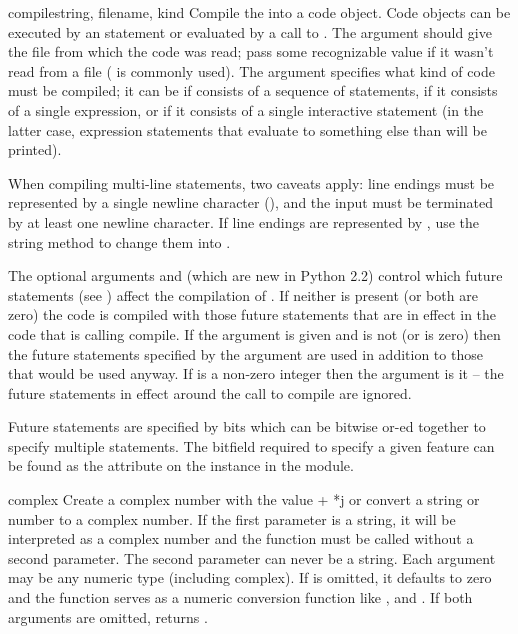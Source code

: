\begin{funcdesc}{compile}{string, filename, kind}
  Compile the  into a code object.  Code objects can be
  executed by an  statement or evaluated by a call to
  .  The  argument should
  give the file from which the code was read; pass some recognizable value
  if it wasn't read from a file ( is commonly used).
  The  argument specifies what kind of code must be
  compiled; it can be  if  consists of a
  sequence of statements,  if it consists of a single
  expression, or  if it consists of a single
  interactive statement (in the latter case, expression statements
  that evaluate to something else than  will be printed).

  When compiling multi-line statements, two caveats apply: line
  endings must be represented by a single newline character
  (), and the input must be terminated by at least one
  newline character.  If line endings are represented by
  , use the string  method to
  change them into .

  The optional arguments  and 
  (which are new in Python 2.2) control which future statements (see
  ) affect the compilation of .  If neither is
  present (or both are zero) the code is compiled with those future
  statements that are in effect in the code that is calling compile.
  If the  argument is given and  is not
  (or is zero) then the future statements specified by the 
  argument are used in addition to those that would be used anyway.
  If  is a non-zero integer then the 
  argument is it -- the future statements in effect around the call to
  compile are ignored.

  Future statements are specified by bits which can be bitwise or-ed
  together to specify multiple statements.  The bitfield required to
  specify a given feature can be found as the 
  attribute on the  instance in the
   module.
\end{funcdesc}

\begin{funcdesc}{complex}{}
  Create a complex number with the value  + *j or
  convert a string or number to a complex number.  If the first
  parameter is a string, it will be interpreted as a complex number
  and the function must be called without a second parameter.  The
  second parameter can never be a string.
  Each argument may be any numeric type (including complex).
  If  is omitted, it defaults to zero and the function
  serves as a numeric conversion function like ,
   and .  If both arguments
  are omitted, returns .
\end{funcdesc}

